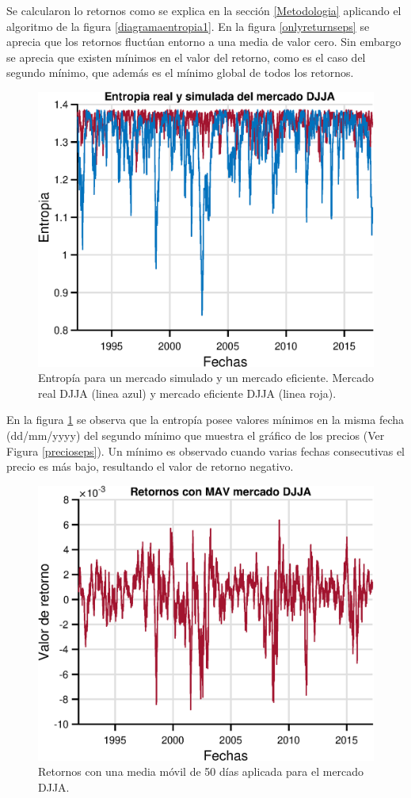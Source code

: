 Se calcularon lo retornos como se explica en la sección \ref{Metodologia} aplicando el algoritmo de la figura  \ref{diagramaentropia1}. En la figura \ref{onlyreturnseps} se aprecia que los retornos fluctúan entorno a una media de valor cero. Sin embargo se aprecia que existen mínimos en el valor del retorno, como es el caso del segundo mínimo, que además es el mínimo global de todos los retornos.


\begin{figure}
	\centering
	\includegraphics[width=0.7\linewidth]{figures/onlyentropyeps}
	\caption{Entropía para un mercado simulado y un mercado eficiente. Mercado real DJJA (linea azul) y mercado eficiente DJJA (linea roja).}
	\label{onlyentropyeps}
\end{figure}


En la figura \ref{onlyentropyeps} se observa que la entropía posee valores mínimos en la misma fecha (dd/mm/yyyy) del segundo mínimo que muestra el gráfico de los precios (Ver Figura \ref{precioseps}). Un mínimo es observado cuando varias fechas consecutivas el precio es más bajo, resultando el valor de retorno negativo. 




\begin{figure}
	\centering
	\includegraphics[width=0.7\linewidth]{figures/MAVreturnseps}
	\caption{Retornos con una media móvil de 50 días aplicada para el mercado DJJA.}
	\label{fig:mavreturnseps}
\end{figure}


